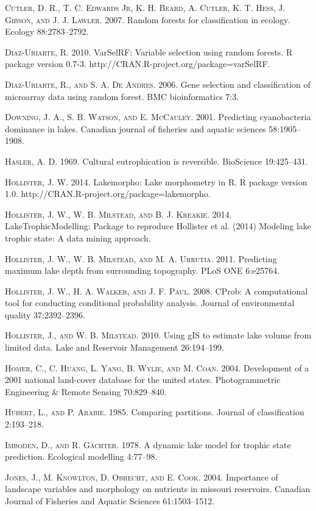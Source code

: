 \documentclass[11pt,]{article}
\begin{document}
\textsc{Cutler, D. R., T. C. Edwards Jr, K. H. Beard, A. Cutler, K. T.
Hess, J. Gibson, and J. J. Lawler}. 2007. Random forests for
classification in ecology. Ecology 88:2783--2792.

\textsc{Diaz-Uriarte, R.} 2010. VarSelRF: Variable selection using
random forests. R package version 0.7-3.
http://CRAN.R-project.org/package=varSelRF.

\textsc{D{í}az-Uriarte, R., and S. A. De Andres}. 2006. Gene selection
and classification of microarray data using random forest. BMC
bioinformatics 7:3.

\textsc{Downing, J. A., S. B. Watson, and E. McCauley}. 2001. Predicting
cyanobacteria dominance in lakes. Canadian journal of fisheries and
aquatic sciences 58:1905--1908.

\textsc{Hasler, A. D.} 1969. Cultural eutrophication is reversible.
BioScience 19:425--431.

\textsc{Hollister, J. W.} 2014. Lakemorpho: Lake morphometry in R. R
package version 1.0. http://CRAN.R-project.org/package=lakemorpho.

\textsc{Hollister, J. W., W. B. Milstead, and B. J. Kreakie}. 2014.
LakeTrophicModelling: Package to reproduce Hollister et al. (2014)
Modeling lake trophic state: A data mining approach.

\textsc{Hollister, J. W., W. B. Milstead, and M. A. Urrutia}. 2011.
Predicting maximum lake depth from surrounding topography. PLoS ONE
6:e25764.

\textsc{Hollister, J. W., H. A. Walker, and J. F. Paul}. 2008. CProb: A
computational tool for conducting conditional probability analysis.
Journal of environmental quality 37:2392--2396.

\textsc{Hollister, J., and W. B. Milstead}. 2010. Using gIS to estimate
lake volume from limited data. Lake and Reservoir Management
26:194--199.

\textsc{Homer, C., C. Huang, L. Yang, B. Wylie, and M. Coan}. 2004.
Development of a 2001 national land-cover database for the united
states. Photogrammetric Engineering \& Remote Sensing 70:829--840.

\textsc{Hubert, L., and P. Arabie}. 1985. Comparing partitions. Journal
of classification 2:193--218.

\textsc{Imboden, D., and R. G{ä}chter}. 1978. A dynamic lake model for
trophic state prediction. Ecological modelling 4:77--98.

\textsc{Jones, J., M. Knowlton, D. Obrecht, and E. Cook}. 2004.
Importance of landscape variables and morphology on nutrients in
missouri reservoirs. Canadian Journal of Fisheries and Aquatic Sciences
61:1503--1512.
\end{document}
